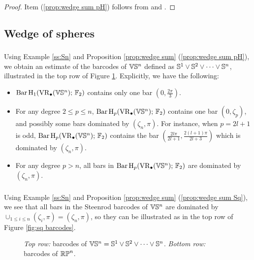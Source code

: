 \begin{proof}
	Item (\ref{prop:wedge sum pH}) follows from \cite[Proposition 3.7]{adamaszek2020homotopy} and \cite[Thoerem 9 (2)]{lim2020vietoris}.
	
\end{proof}

\subsection{Wedge of spheres}

\subsubsection{} Using Example \ref{ss:Sn} and Proposition \ref{prop:wedge sum} (\ref{prop:wedge sum pH}), we obtain an estimate of the barcodes of $\mathbb{V}\mathbb{S}^n$ defined as $\mathbb{S}^1 \vee \mathbb{S}^2 \vee \dots \vee \mathbb{S}^n$, illustrated in the top row of Figure \ref{fig:barcodes}.
Explicitly, we have the following:
\begin{itemize}
	\item $\operatorname{Bar} \operatorname{H}_{1}(\operatorname{VR}_\bullet(\mathbb{V}\mathbb{S}^n);\,{\mathbb{F}_2})$ contains only one bar $(0,\frac{2\pi}{3})$.
	\item For any degree $2\leq p\leq n$, $\operatorname{Bar} \operatorname{H}_{p}(\operatorname{VR}_\bullet(\mathbb{V}\mathbb{S}^n);\,{\mathbb{F}_2})$ contains one bar $(0,\zeta_p)$, and possibly some bars dominated by $(\zeta_n,\pi)$.
	For instance, when $p=2l+1$ is odd, $\operatorname{Bar} \operatorname{H}_{p}(\operatorname{VR}_\bullet(\mathbb{V}\mathbb{S}^n);\,{\mathbb{F}_2})$ contains the bar $( \frac{2l\pi}{2l+1},\frac{2(l+1)\pi}{2l+3})$ which is dominated by $(\zeta_n,\pi)$.
	\item For any degree $p>n$, all bars in $\operatorname{Bar} \operatorname{H}_{p}(\operatorname{VR}_\bullet(\mathbb{V}\mathbb{S}^n);\,{\mathbb{F}_2})$ are dominated by $(\zeta_n,\pi)$.
\end{itemize}

\subsubsection{} Using Example \ref{ss:Sn} and Proposition \ref{prop:wedge sum} (\ref{prop:wedge sum Sq}), we see that all bars in the Steenrod barcodes of $\mathbb{V}\mathbb{S}^n$ are dominated by $\cup_{1\leq i\leq n}(\zeta_i,\pi)=(\zeta_n,\pi)$, so they can be illustrated as in the top row of Figure \ref{fig:sq barcodes}.

\begin{figure}
	\centering
	
	\caption{\emph{Top row:} barcodes of $\mathbb{V}\mathbb{S}^n = \mathbb{S}^1 \vee \mathbb{S}^2 \vee \dots \vee \mathbb{S}^n$. \emph{Bottom row:} barcodes of $\mathbb{RP}^n$.}
	\label{fig:barcodes}
\end{figure}

